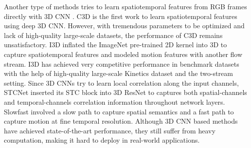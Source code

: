 \documentclass[10pt,twocolumn,letterpaper]{article}
\begin{document}
	Another type of methods tries to learn spatiotemporal features from RGB frames directly with 3D CNN \cite{tran2015learning,carreira2017quo,diba2018spatio,feichtenhofer2018slowfast, stroud2018d3d}. C3D \cite{tran2015learning} is the first work to learn spatiotemporal features using deep 3D CNN. However, with tremendous parameters to be optimized and lack of high-quality large-scale datasets, the performance of C3D remains unsatisfactory. I3D \cite{carreira2017quo} inflated the ImageNet pre-trained 2D kernel into 3D to capture spatiotemporal features and modeled motion features with another flow stream. I3D has achieved very competitive performance in benchmark datasets with the help of high-quality large-scale Kinetics dataset and the two-stream setting. Since 3D CNNs try to learn local correlation along the input channels, STCNet \cite{diba2018spatio} inserted its STC block into 3D ResNet to captures both spatial-channels and temporal-channels correlation information throughout network layers. Slowfast \cite{feichtenhofer2018slowfast} involved a slow path to capture spatial semantics and a fast path to capture motion at fine temporal resolution. Although 3D CNN based methods have achieved state-of-the-art performance, they still suffer from heavy computation, making it hard to deploy in real-world applications.
	
\end{document}
